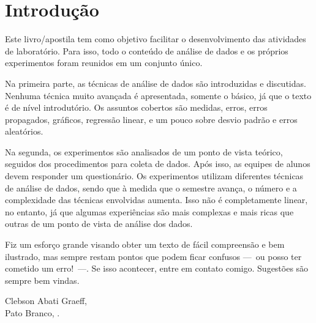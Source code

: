 \chapter*{Introdução}

Este livro/apostila tem como objetivo facilitar o desenvolvimento das atividades de laboratório. Para isso, todo o conteúdo de análise de dados e os próprios experimentos foram reunidos em um conjunto único. 

Na primeira parte, as técnicas de análise de dados são introduzidas e discutidas. Nenhuma técnica muito avançada é apresentada, somente o básico, já que o texto é de nível introdutório. Os assuntos cobertos são medidas, erros, erros propagados, gráficos, regressão linear, e um pouco sobre desvio padrão e erros aleatórios.

Na segunda, os experimentos são analisados de um ponto de vista teórico, seguidos dos procedimentos para coleta de dados. Após isso, as equipes de alunos devem responder um questionário. Os experimentos utilizam diferentes técnicas de análise de dados, sendo que à medida que o semestre avança, o número e a complexidade das técnicas envolvidas aumenta. Isso não é completamente linear, no entanto, já que algumas experiências são mais complexas e mais ricas que outras de um ponto de vista de análise dos dados.

Fiz um esforço grande visando obter um texto de fácil compreensão e bem ilustrado, mas sempre restam pontos que podem ficar confusos ---~ou posso ter cometido um erro!~---. Se isso acontecer, entre em contato comigo. Sugestões são sempre bem vindas.

\vspace{1cm}
\begin{flushright}
Clebson Abati Graeff,\\
Pato Branco, \monthyear.
\end{flushright}

